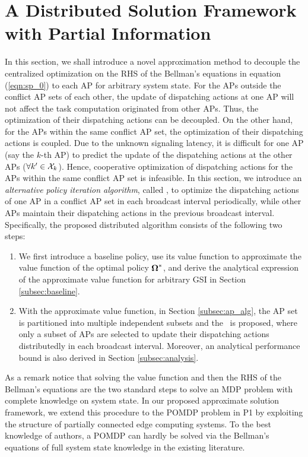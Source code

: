 \section{A Distributed Solution Framework with Partial Information}
\label{sec:algorithm}
In this section, we shall introduce a novel approximation method to decouple the centralized optimization on the RHS of the Bellman's equations in equation (\ref{eqn:sp_0}) to each AP for arbitrary system state.
For the APs outside the conflict AP sets of each other, the update of dispatching actions at one AP will not affect the task computation originated from other APs.
Thus, the optimization of their dispatching actions can be decoupled.
On the other hand, for the APs within the same conflict AP set, the optimization of their dispatching actions is coupled.
Due to the unknown signaling latency, it is difficult for one AP (say the $k$-th AP) to predict the update of the dispatching actions at the other APs ($\forall k' \in\mathcal{X}_{k}$).
Hence, cooperative optimization of dispatching actions for the APs within the same conflict AP set is infeasible.
In this section, we introduce an \emph{alternative policy iteration algorithm}, called \algname, to optimize the dispatching actions of one AP in a conflict AP set in each broadcast interval periodically, while other APs maintain their dispatching actions in the previous broadcast interval.
Specifically, the proposed distributed algorithm consists of the following two steps:
\begin{enumerate}
    \item We first introduce a baseline policy, use its value function to approximate the value function of the optimal policy $\boldsymbol{\Omega}^*$, and derive the analytical expression of the approximate value function for arbitrary GSI in Section \ref{subsec:baseline}.
    \item With the approximate value function, in Section \ref{subsec:ap_alg}, {the AP set is partitioned into multiple independent subsets and the \algname~is proposed,}
    where only a subset of APs are selected to update their dispatching actions distributedly in each broadcast interval.
    Moreover, an analytical performance bound is also derived in Section \ref{subsec:analysis}.
\end{enumerate}
As a remark notice that solving the value function and then the RHS of the Bellman's equations are the two standard steps to solve an MDP problem with complete knowledge on system state.
In our proposed approximate solution framework, we extend this procedure to the POMDP problem in P1 by exploiting the structure of partially connected edge computing systems.
To the best knowledge of authors, a POMDP can hardly be solved via the Bellman's equations of full system state knowledge in the existing literature.

